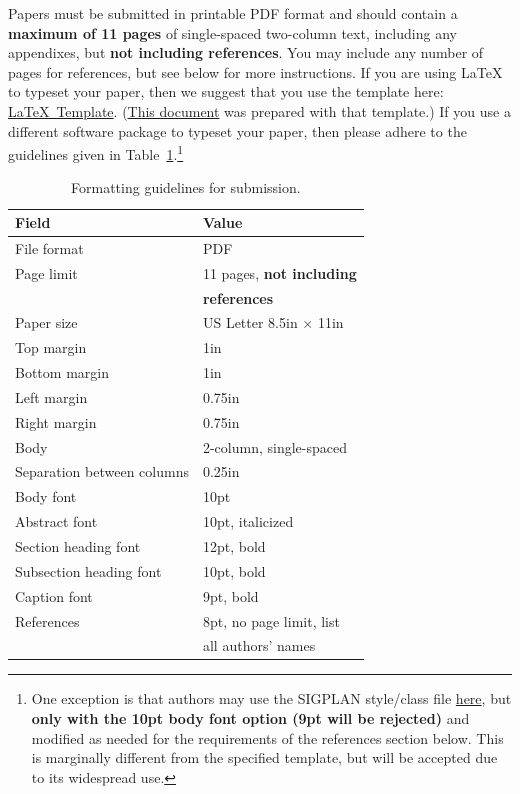 \documentclass[pageno]{jpaper}
\begin{document}
Papers must be submitted in printable PDF format and should contain a
{\bf maximum of 11 pages} of single-spaced two-column text, including any
appendixes, but {\bf not
  including references}.  You may include any number of pages for
references, but see below for more instructions.  If you are using
\LaTeX~\cite{lamport94} to typeset your paper, then we suggest that
you use the template here:
\href{https://www.asplos2018.org/wp-content/uploads/2017/07/asplos18-latex-template.tar.gz}{\LaTeX~Template}.
(\href{https://www.asplos2018.org/wp-content/uploads/2017/07/asplos18-template.pdf}{This
  document} was prepared with that template.)  If you use a different
software package to typeset your paper, then please adhere to the
guidelines given in Table~\ref{table:formatting}.\footnote{One
  exception is that authors may use the SIGPLAN style/class file
  \href{http://classic.sigplan.org/sigplanconf.cls}{here}, but {\bf
    only with the 10pt body font option (9pt will be rejected)} and
  modified as needed for the requirements of the references section
  below.  This is marginally different from the specified template,
  but will be accepted due to its widespread use.}

\begin{table}[h!]
  \centering
  \begin{tabular}{|l|l|}
    \hline
    \textbf{Field} & \textbf{Value}\\
    \hline
    \hline
    File format & PDF \\
    \hline
    Page limit & 11 pages, {\bf not including}\\
               & {\bf references}\\
    \hline
    Paper size & US Letter 8.5in $\times$ 11in\\
    \hline
    Top margin & 1in\\
    \hline
    Bottom margin & 1in\\
    \hline
    Left margin & 0.75in\\
    \hline
    Right margin & 0.75in\\
    \hline
    Body & 2-column, single-spaced\\
    \hline
    Separation between columns & 0.25in\\
    \hline
    Body font & 10pt\\
    \hline
    Abstract font & 10pt, italicized\\
    \hline
    Section heading font & 12pt, bold\\
    \hline
    Subsection heading font & 10pt, bold\\
    \hline
    Caption font & 9pt, bold\\
    \hline
    References & 8pt, no page limit, list \\
               & all authors' names\\
    \hline
  \end{tabular}
  \caption{Formatting guidelines for submission. }
  \label{table:formatting}
\end{table}
\end{document}
